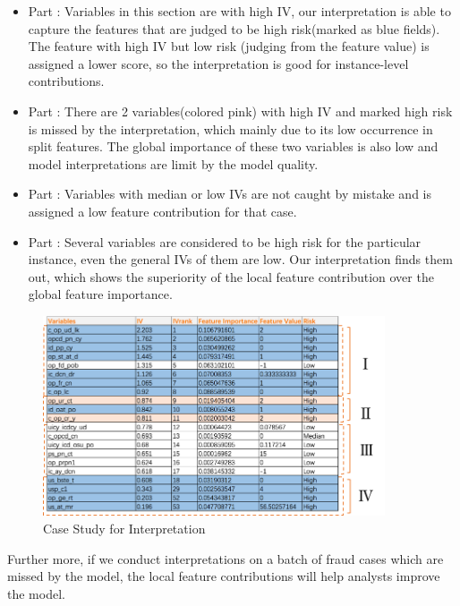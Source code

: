 \begin{itemize}
\item Part \uppercase\expandafter{}: 
Variables in this section are with high IV, our interpretation is able to capture the features that are 
judged to be high risk(marked as blue fields). The feature with high IV but low risk (judging from
the feature value) is assigned a lower score, so the interpretation is good for instance-level contributions.
\item Part \uppercase\expandafter{}:
 There are 2 variables(colored pink)  with high IV and marked high risk is missed by the interpretation, which 
 mainly due to its low occurrence in split features. The global importance of these two variables is also low and
 model interpretations are limit by the model quality.
\item Part \uppercase\expandafter{}: 
Variables with median or low IVs are not caught by mistake and is assigned a low feature contribution for that case.
\item Part \uppercase\expandafter{}: 
Several variables are considered to be high risk for the particular instance, even the general IVs of them are low. 
Our interpretation finds them out, which shows the superiority of the local feature contribution over the global feature importance.
\end{itemize}
\begin{figure}[htbp]
 \centering
 \includegraphics[width=0.9\textwidth]{pic/case.png}
    \caption{Case Study for Interpretation}\label{figcase}
\end{figure}
Further more, if we conduct interpretations on a batch of  fraud cases which are missed by the model,
the local feature contributions will help analysts improve the model.

